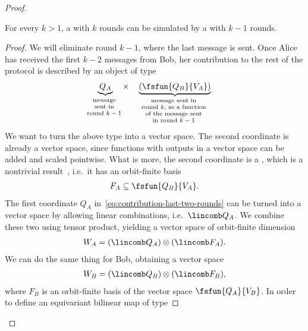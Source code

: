 \begin{proof}
    \begin{claim}\label{claim:reduce-round}
      For every $k > 1$, a  with $k$ rounds can be simulated by a 
       with $k-1$ rounds.
    \end{claim}
    \begin{proof}
        We will eliminate round $k-1$, where the last message is sent. 
        Once Alice has received the first $k-2$ messages from Bob, 
        her contribution to the rest of the protocol is described by an object of type 
          \begin{align}\label{eq:contribution-last-two-rounds}
            \myunderbrace{Q_A}{message \\ sent in \\ round $k-1$} \quad \times \quad  \myunderbrace{(\fsfun  {Q_B} {V_A})}{message sent in \\ round $k$, as a function \\ of the message sent \\ in  round $k-1$}
        \end{align}
        We want to turn the above type into a vector space. 
        The second coordinate is already a vector space, since functions with outputs in a vector space can be added and scaled pointwise. What is more, the  second coordinate  is  a , which is a nontrivial result~\cite[Theorem 8.16]{bojanczyk_slightly}, i.e.~it has an orbit-finite basis  
        \begin{align*}
        F_A \subseteq \fsfun  {Q_B} {V_A}.  
        \end{align*}
        The first coordinate $Q_A$ in~\eqref{eq:contribution-last-two-rounds} can be turned into a vector space by  allowing linear combinations, i.e.~$\lincomb Q_A$. We combine these two using tensor product, yielding a vector space of orbit-finite dimension
        \begin{align*}
           W_A =  (\lincomb Q_A) \otimes (\lincomb F_A).
        \end{align*}
        We can do the same thing for Bob, obtaining a vector space
        \begin{align*}
           W_B =  (\lincomb Q_B) \otimes (\lincomb F_B),
        \end{align*}
        where $F_B$ is an orbit-finite basis of the vector space $\fsfun  {Q_A} {V_B}$.
        In order to define an equivariant bilinear map of type

\end{proof}
\end{proof}
